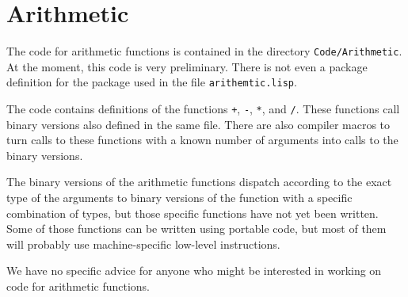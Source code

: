 \chapter{Arithmetic}

The code for arithmetic functions is contained in the directory
\texttt{Code/Arithmetic}.  At the moment, this code is very
preliminary.  There is not even a package definition for the package
used in the file \texttt{arithemtic.lisp}.

The code contains definitions of the functions \texttt{+}, \texttt{-},
\texttt{*}, and \texttt{/}.  These functions call binary versions also
defined in the same file.  There are also compiler macros to turn
calls to these functions with a known number of arguments into calls
to the binary versions.

The binary versions of the arithmetic functions dispatch according to
the exact type of the arguments to binary versions of the function
with a specific combination of types, but those specific functions
have not yet been written.  Some of those functions can be written
using portable code, but most of them will probably use
machine-specific low-level instructions. 

We have no specific advice for anyone who might be interested in
working on code for arithmetic functions.  
